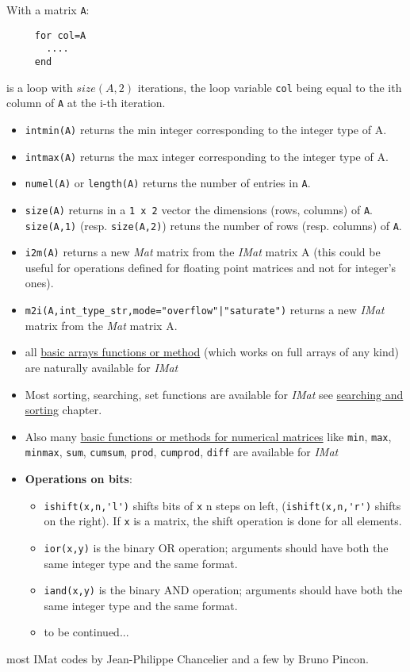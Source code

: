 
With a matrix \verb+A+:
\begin{verbatim}
     for col=A
       ....
     end
\end{verbatim} 
is a loop with $size(A,2)$ iterations, the loop 
variable  \verb+col+ being equal to the ith column of \verb+A+ at the i-th iteration.

\begin{itemize}
   \item \verb+intmin(A)+ \hypertarget{intmin}{} returns the min integer corresponding to the integer type of A.
   \item \verb+intmax(A)+ \hypertarget{intmax}{} returns the max integer corresponding to the integer type of A. 
   \item \verb+numel(A)+ or \verb+length(A)+ returns the number of entries in \verb+A+.
   \item \verb+size(A)+ returns in a \verb+1 x 2+ vector the dimensions (rows, columns)
of \verb+A+. \verb+size(A,1)+ (resp. \verb+size(A,2)+) retuns the number of rows 
(resp. columns) of \verb+A+.
   \item \verb+i2m(A)+    \hypertarget{i2m}{} returns a new \emph{Mat} matrix from the \emph{IMat} matrix A (this could be useful for
    operations defined for floating point matrices and not for integer's ones).  
   \item \verb+m2i(A,int_type_str,mode="overflow"|"saturate")+  \hypertarget{m2i}{} 
     returns a new \emph{IMat} matrix from the \emph{Mat} matrix A.
   \item all \hyperlink{arrays}{basic arrays functions or method} (which works on full arrays of any kind) 
     are naturally available for \emph{IMat} 
    \item Most sorting, searching, set functions are available for \emph{IMat} see \hyperlink{searchandsort}{searching
      and sorting} chapter.
   \item Also many \hyperlink{basicnumarrays}{basic functions or methods for numerical matrices} like \verb+min+, 
      \verb+max+, \verb+minmax+, \verb+sum+, \verb+cumsum+, \verb+prod+,  \verb+cumprod+, \verb+diff+ are available
       for \emph{IMat}
   \item {\bf Operations on bits}: 
   \begin{itemize}
   \item \verb+ishift(x,n,'l')+ shifts bits of \verb+x+ n steps on left, (\verb+ishift(x,n,'r')+ shifts on the right).
          If \verb+x+ is a matrix, the shift operation is done for all elements.
   \item \verb+ior(x,y)+ is the binary OR operation; arguments should have both the same integer type
         and the same format.
   \item \verb+iand(x,y)+ is the binary AND operation; arguments should have both the same integer type
         and the same format. 
   \item to be continued...
   \end{itemize}
\end{itemize}


\begin{authors}
   most IMat codes by Jean-Philippe Chancelier and a few by Bruno Pincon.
\end{authors}
